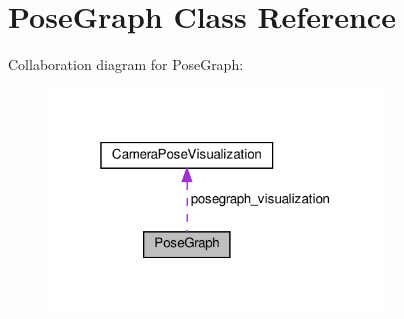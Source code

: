 \hypertarget{classPoseGraph}{}\section{Pose\+Graph Class Reference}
\label{classPoseGraph}


Collaboration diagram for Pose\+Graph\+:\nopagebreak
\begin{figure}[H]
\begin{center}
\leavevmode
\includegraphics[width=253pt]{classPoseGraph__coll__graph}
\end{center}
\end{figure}

